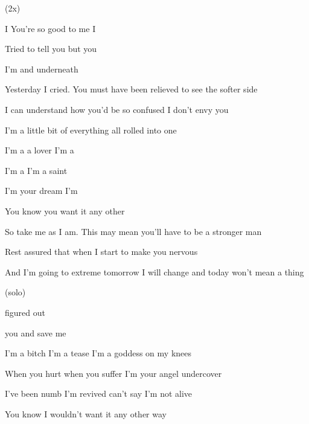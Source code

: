 
(2x)

   

\zs
I  You're so good to me I 

Tried to tell you but you 

I'm and  underneath 
 \ks

\zs
Yesterday I cried. You must have been relieved to see the softer side

I can understand how you'd be so confused I don't envy you

I'm a little bit of everything all rolled into one
\ks

\zr
I'm a  a lover I'm a 

I'm a  I'm a saint 

I'm your  dream I'm 

You know you  want it any other 
\kr

\zs
So take me as I am. This may mean you'll have to be a stronger man

Rest assured that when I start to make you nervous

And I'm going to extreme tomorrow I will change and today won't mean a thing
\ks

\zr

\kr

\zr (solo) \kr

 figured out  

 you  and  save me

\zr
\kr

\zr
I'm a bitch I'm a tease I'm a goddess on my knees

When you hurt when you suffer I'm your angel undercover

I've been numb I'm revived can't say I'm not alive

You know I wouldn't want it any other way
\kr

        

      


\kp
